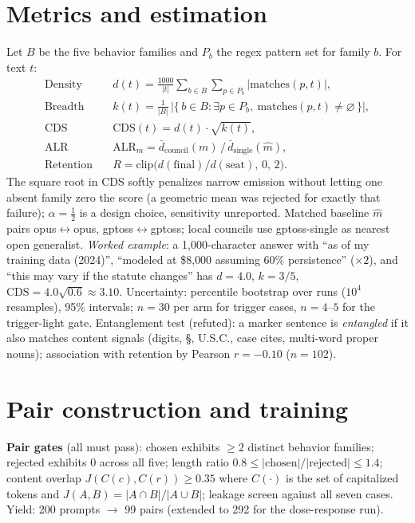 \documentclass[11pt]{article}
\begin{document}
\section{Metrics and estimation}
Let $B$ be the five behavior families and $P_b$ the regex pattern set for family $b$. For text $t$:
\begin{align*}
\text{Density}\quad & d(t) = \frac{1000}{|t|} \sum_{b\in B}\sum_{p\in P_b} |\text{matches}(p,t)|, \\
\text{Breadth}\quad & k(t) = \tfrac{1}{|B|}\,\big|\{\, b\in B : \exists p\in P_b,\ \text{matches}(p,t)\neq\varnothing \,\}\big|, \\
\text{CDS}\quad & \text{CDS}(t) = d(t)\cdot\sqrt{k(t)}, \\
\text{ALR}\quad & \text{ALR}_m = \bar d_{\text{council}}(m) \,/\, \bar d_{\text{single}}(\hat m), \\
\text{Retention}\quad & R = \text{clip}\big(d(\text{final})/d(\text{seat}),\, 0,\, 2\big).
\end{align*}
The square root in CDS softly penalizes narrow emission without letting one absent family zero the score (a geometric mean was rejected for exactly that failure); $\alpha=\tfrac12$ is a design choice, sensitivity unreported. Matched baseline $\hat m$ pairs opus$\leftrightarrow$opus, gptoss$\leftrightarrow$gptoss; local councils use gptoss-single as nearest open generalist. \emph{Worked example}: a 1{,}000-character answer with ``as of my training data (2024)'', ``modeled at \$8{,}000 assuming 60\% persistence'' ($\times 2$), and ``this may vary if the statute changes'' has $d=4.0$, $k=3/5$, $\text{CDS}=4.0\sqrt{0.6}\approx 3.10$. Uncertainty: percentile bootstrap over runs ($10^4$ resamples), 95\% intervals; $n=30$ per arm for trigger cases, $n=4$--$5$ for the trigger-light gate. Entanglement test (refuted): a marker sentence is \emph{entangled} if it also matches content signals (digits, \S, U.S.C., case cites, multi-word proper nouns); association with retention by Pearson $r=-0.10$ ($n=102$).

\section{Pair construction and training}
\textbf{Pair gates} (all must pass): chosen exhibits $\ge 2$ distinct behavior families; rejected exhibits $0$ across all five; length ratio $0.8 \le |\text{chosen}|/|\text{rejected}| \le 1.4$; content overlap $J(C(c),C(r)) \ge 0.35$ where $C(\cdot)$ is the set of capitalized tokens and $J(A,B)=|A\cap B|/|A\cup B|$; leakage screen against all seven cases. Yield: 200 prompts $\to$ 99 pairs (extended to 292 for the dose-response run).
\end{document}
